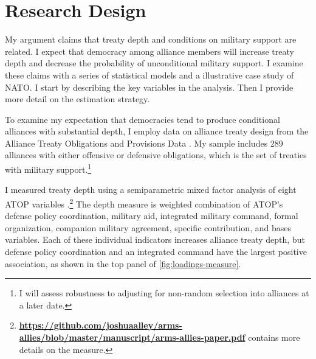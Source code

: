\documentclass[12pt]{article}
\begin{document}
\section{Research Design}


My argument claims that treaty depth and conditions on military support are related. 
I expect that democracy among alliance members will increase treaty depth and decrease the probability of unconditional military support. 
I examine these claims with a series of statistical models and a illustrative case study of NATO. 
I start by describing the key variables in the analysis. 
Then I provide more detail on the estimation strategy. 


To examine my expectation that democracies tend to produce conditional alliances with substantial depth, I employ data on alliance treaty design from the Alliance Treaty Obligations and Provisions Data \citep{Leedsetal2002}. 
My sample includes 289 alliances with either offensive or defensive obligations, which is the set of treaties with military support.\footnote{I will assess robustness to adjusting for non-random selection into alliances at a later date.} 


I measured treaty depth using a semiparametric mixed factor analysis of eight ATOP variables \citep{Murrayetal2013}.\footnote{\textbf{\url{https://github.com/joshuaalley/arms-allies/blob/master/manuscript/arms-allies-paper.pdf}} contains more details on the measure.}
The depth measure is weighted combination of ATOP's defense policy coordination, military aid, integrated military command, formal organization, companion military agreement, specific contribution, and bases variables. 
Each of these individual indicators increases alliance treaty depth, but defense policy coordination and an integrated command have the largest positive association, as shown in the top panel of \autoref{fig:loadings-measure}. 
\end{document}
